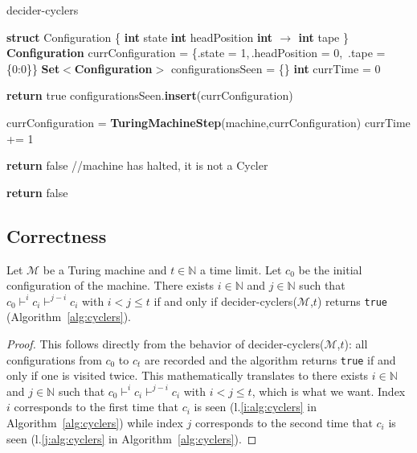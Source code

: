 \begin{algorithm}
  \caption{{\sc decider-cyclers}}\label{alg:cyclers}

  \begin{algorithmic}[1]

    \State \textbf{struct} Configuration \{
    \State \tabi\textbf{int} state
    \State \tabi\textbf{int} headPosition
    \State \tabi\textbf{int $\boldsymbol{\to}$ int} tape
    \State \}
    \State
    \State \textbf{Configuration} currConfiguration = \{.state = 1,$\,$.headPosition = 0,$\,$ .tape = \{0:0\}\}
    \State \textbf{Set$\boldsymbol{<}$Configuration$\boldsymbol{>}$} configurationsSeen = \{\}
    \State \textbf{int} currTime = 0

     \label{j:alg:cyclers}
    \State \textbf{return} true
    \EndIf
    \State configurationsSeen.\textbf{insert}(currConfiguration) \label{i:alg:cyclers}

    \State currConfiguration = \textbf{TuringMachineStep}(machine,currConfiguration)
    \State currTime += 1


    \State \textbf{return} false //machine has halted, it is not a Cycler
    \EndIf
    \EndWhile

    \State \textbf{return} false
    \EndProcedure

  \end{algorithmic}
\end{algorithm}

\subsection{Correctness}



\begin{theorem}\label{th:cyclers} Let $\mathcal{M}$ be a Turing machine and $t \in \mathbb{N}$ a time limit. Let $c_0$ be the initial configuration of the machine. There exists $i\in\mathbb{N}$ and $j\in\mathbb{N}$ such that $c_0 \vdash^i c_i \vdash^{j-i} c_i$ with $i < j \leq t$ if and only if {\sc decider-cyclers}($\mathcal{M}$,$t$) returns \texttt{true} (Algorithm~\ref{alg:cyclers}).
\end{theorem}
\begin{proof}
  This follows directly from the behavior of {\sc decider-cyclers}($\mathcal{M}$,$t$): all configurations from $c_0$ to $c_t$ are recorded and the algorithm returns \texttt{true} if and only if one is visited twice. This mathematically translates to
  there exists $i\in\mathbb{N}$ and $j\in\mathbb{N}$ such that $c_0 \vdash^i c_i \vdash^{j-i} c_i$ with $i < j \leq t$, which is what we want. Index $i$ corresponds to the first time that $c_i$ is seen (l.\ref{i:alg:cyclers} in Algorithm~\ref{alg:cyclers}) while index $j$ corresponds to the second time that $c_i$ is seen (l.\ref{j:alg:cyclers} in Algorithm~\ref{alg:cyclers}).
\end{proof}


